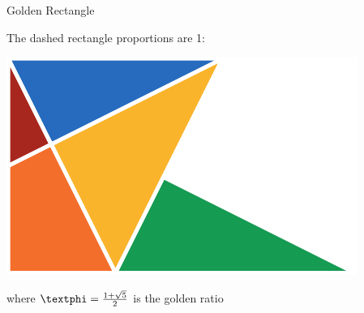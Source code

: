 \documentclass[14pt]{beamer}
\begin{document}

    \begin{frame}{Golden Rectangle}
        \begin{center}
            The dashed rectangle proportions are 1:\textphi

            \bigskip\bigskip

            \includegraphics[scale=1.0]{figures/figure030a.pdf} \\

            \bigskip\bigskip

             where $\text{\textphi} =\tfrac{1+\sqrt{5}}{2}$ is the golden ratio
        \end{center}
    \end{frame}

\end{document}
